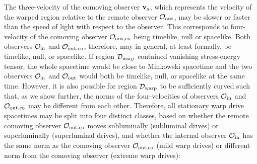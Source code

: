 \documentclass[10pt]{iopart}
\begin{document}
The three-velocity of the comoving observer ${\bf v}_s$, { which represents the velocity of the warped region relative to the remote observer $\mathcal{O}_{\rm out}$}, may be slower or faster than the speed of light with respect to the observer. This corresponds to four-velocity of the comoving observer $\mathcal{O}_{\rm out, co}$ being timelike, null or spacelike. Both observers $\mathcal{O}_{\rm in}$ and $\mathcal{O}_{\rm out, co}$, therefore, may in general, at least formally, be timelike, null, or spacelike. If region $\mathcal{D}_{\rm warp}$ contained vanishing stress-energy tensor, the whole spacetime would be close to Minkowski spacetime and the two observers $\mathcal{O}_{\rm in}$ and $\mathcal{O}_{\rm out}$ would both be timelike, null, or spacelike at the same time. However, it is also possible for region $\mathcal{D}_{\rm warp}$ to be sufficiently curved such that, as we show further, the norms of the four-velocities of observers $\mathcal{O}_{\rm in}$ and $\mathcal{O}_{\rm out,co}$ may be different from each other. Therefore, all stationary warp drive spacetimes may be split into four distinct classes, based on whether the remote comoving observer  $\mathcal{O}_{\rm out,co}$  moves subluminally (subluminal drives) or superluminally (superluminal drives), and whether the internal observer $\mathcal{O}_{\rm in}$ has the same norm as the comoving observer  $\mathcal{O}_{\rm out,co}$ (mild warp drives) or different norm from the comoving observer (extreme warp drives):
\end{document}
